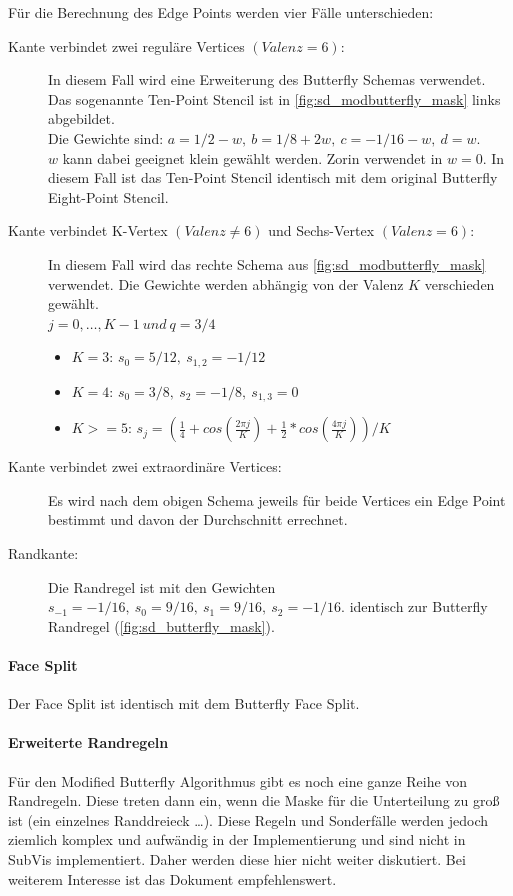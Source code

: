 Für die Berechnung des Edge Points werden vier Fälle unterschieden:
\begin{description}
\item[Kante verbindet zwei reguläre Vertices \((Valenz = 6)\):]
In diesem Fall wird eine Erweiterung
des Butterfly Schemas verwendet. Das sogenannte Ten-Point Stencil ist in \autoref{fig:sd_modbutterfly_mask} links abgebildet.\\
Die Gewichte sind:
\(a = 1/2 - w,\ b = 1/8 + 2w,\ c = -1/16 - w,\ d = w\).\\
\(w\) kann dabei geeignet klein gewählt werden.
Zorin verwendet in \cite{Zorin:1996:ISM:237170.237254} \(w = 0\).
In diesem Fall ist das Ten-Point Stencil identisch mit dem original
Butterfly Eight-Point Stencil.
\item[Kante verbindet K-Vertex \((Valenz \neq 6)\) und Sechs-Vertex \((Valenz = 6)\):]
In diesem Fall wird das rechte Schema aus \autoref{fig:sd_modbutterfly_mask} verwendet.
Die Gewichte werden abhängig von der Valenz \(K\) verschieden gewählt.\\
\(j = 0, \ldots, K - 1\ und\ q = 3/4\)
\begin{itemize}
 \item \(K = 3\): \(s_0 = 5/12,\ s_{1,2} = -1/12\)
 \item \(K = 4\): \(s_0 = 3/8,\ s_{2} = -1/8,\ s_{1,3} = 0\)
 \item \(K >= 5\): \(s_j = (\frac{1}{4}+ cos(\frac{2 \pi j}{K}) + \frac{1}{2} * cos(\frac{4 \pi j}{K}))/K\)
\end{itemize}
\item[Kante verbindet zwei extraordinäre Vertices:]
Es wird nach dem obigen Schema jeweils für beide Vertices ein Edge Point bestimmt und
davon der Durchschnitt errechnet.
\item[Randkante:] Die Randregel ist mit den Gewichten
\(s_{-1} = -1/16,\ s_0 = 9/16,\ s_1 = 9/16,\ s_2 = -1/16\).
identisch zur Butterfly Randregel
(\autoref{fig:sd_butterfly_mask}).
\end{description}
\cite{Zorin:1996:ISM:237170.237254}
\cite[S. 72 ff.]{Zorin.subdivcourse}
\cite{Gamasutra}
\cite{Sharp}


\paragraph*{Face Split}
Der Face Split ist identisch mit dem Butterfly Face Split.
\cite{Zorin:1996:ISM:237170.237254}
\cite[S. 72ff]{Zorin.subdivcourse}

\paragraph*{Erweiterte Randregeln}

Für den Modified Butterfly Algorithmus gibt es noch eine ganze Reihe von
Randregeln. Diese treten dann ein, wenn die Maske für die Unterteilung zu groß ist
(ein einzelnes Randdreieck \ldots).
Diese Regeln und Sonderfälle werden jedoch ziemlich komplex und aufwändig in der Implementierung
und sind nicht in SubVis implementiert. Daher werden diese hier nicht weiter diskutiert.
Bei weiterem Interesse ist das Dokument \cite[S. 74 f.]{Zorin.subdivcourse}
empfehlenswert.

